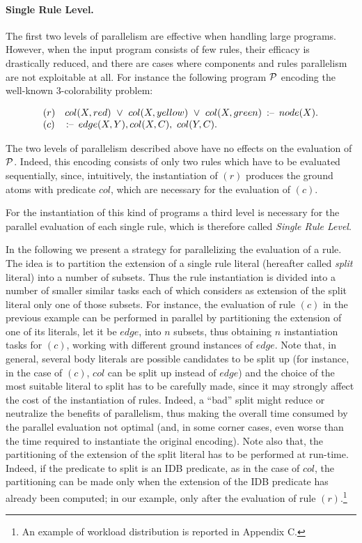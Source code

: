 \documentclass[preprint]{tlp}
\newcommand{\Or}{\ensuremath{\vee}}
\newcommand{\derives}{\ensuremath{\mbox{\,$:$--}\,}\xspace}
\newcommand{\p}{\ensuremath{{\cal P}}\xspace}
\newenvironment{dlvcode}
  {\begin{displaymath}\begin{array}{l}}
  {\end{array}\end{displaymath}}
\begin{document}
\paragraph{Single Rule Level.}\label{sec:rew}
The first two levels of parallelism are effective when handling large programs.
However, when the input program consists of few rules, their efficacy is drastically reduced, and
there are cases where components and rules parallelism are not
exploitable at all. For instance the following program \p encoding the
well-known 3-colorability problem:

\begin{small}
\begin{dlvcode}
(r)\ \ \ col(X,red)\ \Or\ col(X,yellow)\ \Or\ col(X,green)\ \derives\ node(X). \\
(c)\ \ \ \derives\ edge(X,Y), col(X,C),\ col(Y,C).
\end{dlvcode}
\end{small}

\noindent The two levels of parallelism described above have no
effects on the evaluation of \p. Indeed, this encoding consists of
only two rules which have to be evaluated sequentially, since,
intuitively, the instantiation of $(r)$ produces the ground atoms
with predicate $col$, which are necessary for the evaluation of
$(c)$.

For the instantiation of this kind of programs a third level is
necessary for the parallel evaluation of each single rule, which is
therefore called {\em Single Rule Level}.

In the following we present a strategy  for parallelizing the evaluation of a rule. The idea is to
partition the extension of a single rule literal (hereafter called {\em split} literal)
 into a number of subsets. Thus  the rule instantiation is divided into a number of smaller similar tasks
each of which considers as extension of the split literal only one of those subsets.
For instance, the evaluation of rule $(c)$ in the previous example can be performed in parallel by
partitioning the extension of one of its literals, let it be $edge$, into $n$ subsets, thus obtaining
$n$ instantiation tasks for $(c)$, working with different ground instances of $edge$.
Note that, in general, several body literals are possible candidates to be split up
(for instance, in the case of $(c)$, $col$ can be split up instead
of $edge$) and the choice of the most suitable literal to split has to be
carefully made, since it may strongly affect the cost of the
instantiation of rules. Indeed, a ``bad'' split might reduce or
neutralize the benefits of parallelism, thus making the overall time
consumed by the parallel evaluation not optimal (and, in some corner
cases, even worse than the time required to instantiate the original
encoding).
Note also that, the partitioning of the extension of the split literal has to be performed at run-time.
Indeed, if  the predicate to split is an IDB predicate,
as in the case of $col$, the partitioning can be made only when the extension of the IDB predicate has
already been computed; in our example, only after the evaluation of rule $(r)$.\footnote{An example of workload distribution is reported in Appendix C.}
\end{document}

